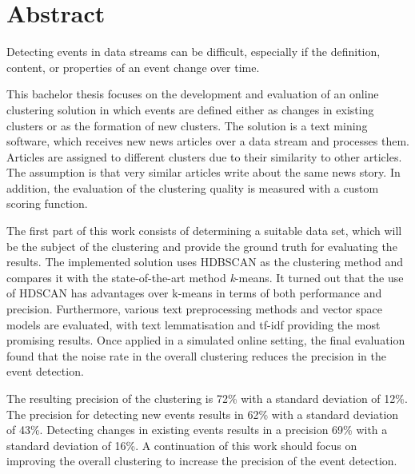 \section*{Abstract}

Detecting events in data streams can be difficult,
especially if the definition, content, or properties of an event change over time.

This bachelor thesis focuses on the development and evaluation of an online clustering solution
in which events are defined either as changes in existing clusters or as the formation of new clusters.
The solution is a text mining software, which receives new news articles over a data stream and processes them.
Articles are assigned to different clusters due to their similarity to other articles.
The assumption is that very similar articles write about the same news story.
In addition, the evaluation of the clustering quality is measured with a custom scoring function.

The first part of this work consists of determining a suitable data set,
which will be the subject of the clustering and provide the ground truth for evaluating the results.
The implemented solution uses HDBSCAN as the clustering method
and compares it with the state-of-the-art method \textit{k}-means.
It turned out that the use of HDSCAN has advantages over k-means in terms of both performance and precision.
Furthermore, various text preprocessing methods and vector space models are evaluated,
with text lemmatisation and tf-idf providing the most promising results.
Once applied in a simulated online setting,
the final evaluation found that the noise rate in the overall clustering reduces the precision in the event detection.

The resulting precision of the clustering is 72\% with a standard deviation of 12\%.
The precision for detecting new events results in 62\% with a standard deviation of 43\%.
Detecting changes in existing events results in a precision 69\% with a standard deviation of 16\%.
A continuation of this work should focus on improving the overall clustering to increase the precision of the event detection.
